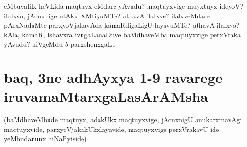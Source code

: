 \begin{artha}
eMbuvalilx heVLida maqtuyx eMdare yAvudu? maqtuyxvige muyxtuyx ideyoV? ilalxvo, jAcnxnige  utAkxrXMtiyuMTe? athavA ilalxve? ilalxveMdare pArxNadaMte parxyoVjakavAda kamaRdigaLigU layavuMTe? athavA ilalxvo? kAla, kamaR, Ishavxra ivugaLanaDuve baMdhaveMba maqtuyxvige perxVraka yAvudu? hiVgeMdu 5 parxshenxgaLu-
\end{artha}


\section*{baq, 3ne adhAyxya 1-9 ravarege iruvamaMtarxgaLasArAMsha}

\begin{artha}
(baMdhaveMbude maqtuyx, adakUkx maqtuyxvige, jAcnxnigU anukarxmavAgi maqtuyxvide, 
parxyoVjakakUkxlayavide, maqtuyxvige perxVrakavU ide yeMbudanunx niNaRyiside)


\end{artha}
